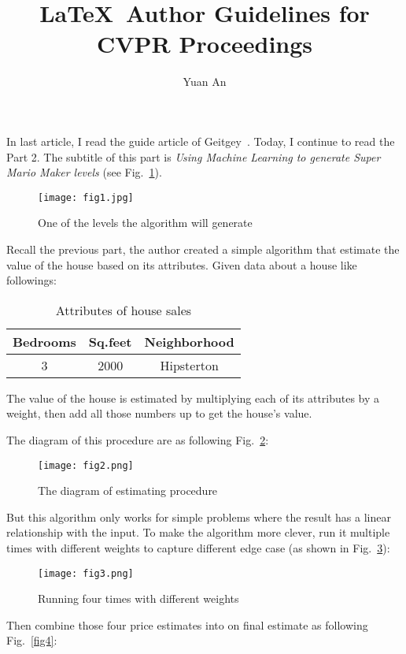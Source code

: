 \documentclass[10pt,twocolumn,letterpaper]{article}
\begin{document}
	\title{\LaTeX\ Author Guidelines for CVPR Proceedings}	
	\author{Yuan An}

	\maketitle
	In last article, I read the guide article of Geitgey~\cite{MLisFun}. Today, I continue to read the Part 2. The subtitle of this part is \emph{Using Machine Learning to generate Super Mario Maker levels} (see Fig.~\ref{fig1}). 
	\begin{figure}[h]
		\centering
		\texttt{[image: fig1.jpg]}
		\caption{One of the levels the algorithm will generate}\label{fig1}
	\end{figure}
	\par
	Recall the previous part, the author created a simple algorithm that estimate the value of the house based on its attributes. Given data about a house like followings:
	\begin{table}[h]
		\centering
		\caption{Attributes of house sales}
		\begin{tabular}{ccc}
			\toprule
			Bedrooms & Sq.feet & Neighborhood\\
			\midrule
			3 & 2000 & Hipsterton \\
			\bottomrule
		\end{tabular}
	\end{table}
	\par
	The value of the house is estimated by multiplying each of its attributes by a weight, then add all those numbers up to get the house's value.
	\par
	The diagram of this procedure are as following Fig.~\ref{fig2}:
	\begin{figure}[h]
		\centering
		\texttt{[image: fig2.png]}
		\caption{The diagram of estimating procedure}\label{fig2}
	\end{figure}
	\par
	But this algorithm only works for simple problems where the result has a linear relationship with the input. To make the algorithm more clever, run it multiple times with different weights to capture different edge case (as shown in Fig.~\ref{fig3}):
	\begin{figure}[h]
		\centering
		\texttt{[image: fig3.png]}
		\caption{Running four times with different weights}\label{fig3}
	\end{figure}
	\par
	Then combine those four price estimates into on final estimate as following Fig.~\ref{fig4}:
\end{document}
